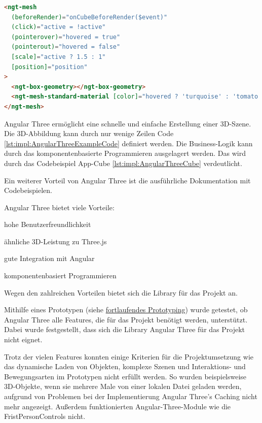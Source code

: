 \begin{lstlisting}[language=html,caption=Angular Three - App Cube  \cite{AngularThreeDocumentationFirstScene},label=lst:impl:AngularThreeCube]
<ngt-mesh
  (beforeRender)="onCubeBeforeRender($event)"
  (click)="active = !active"
  (pointerover)="hovered = true"
  (pointerout)="hovered = false"
  [scale]="active ? 1.5 : 1"
  [position]="position"
>
  <ngt-box-geometry></ngt-box-geometry>
  <ngt-mesh-standard-material [color]="hovered ? 'turquoise' : 'tomato'"></ngt-mesh-standard-material>
</ngt-mesh>
\end{lstlisting}
Angular Three ermöglicht eine schnelle und einfache Erstellung einer 3D-Szene. Die 3D-Abbildung kann durch nur wenige Zeilen Code \ref{lst:impl:AngularThreeExampleCode} definiert werden. Die Business-Logik kann durch das komponentenbasierte Programmieren ausgelagert werden. Das wird durch das Codebeispiel App-Cube \ref{lst:impl:AngularThreeCube} verdeutlicht.  \cite{AngularThreeCode}

Ein weiterer Vorteil von Angular Three ist die ausführliche Dokumentation mit Codebeispielen. \cite{AngularThreeCode}

Angular Three bietet viele Vorteile: 
\begin{compactitem}
  \item hohe Benutzerfreundlichkeit
  \item ähnliche 3D-Leistung zu Three.js
  \item gute Integration mit Angular
  \item komponentenbasiert Programmieren
\end{compactitem}
Wegen den zahlreichen Vorteilen bietet sich die Library für das Projekt an.

Mithilfe eines Prototypen (siehe \hyperref[ch::ongoing-prototyping]{fortlaufendes Prototyping}) wurde getestet, ob Angular Three alle Features, die für das Projekt benötigt werden, unterstützt. Dabei wurde festgestellt, dass sich die Library Angular Three für das Projekt nicht eignet. 

Trotz der vielen Features konnten einige Kriterien für die Projektumsetzung wie das dynamische Laden von Objekten, komplexe Szenen und Interaktions- und Bewegungsarten im Prototypen nicht erfüllt werden. So wurden beispielsweise 3D-Objekte, wenn sie mehrere Male von einer lokalen Datei geladen werden, aufgrund von Problemen bei der Implementierung Angular Three's Caching nicht mehr angezeigt. Außerdem funktionierten Angular-Three-Module wie die FristPersonControls nicht.

